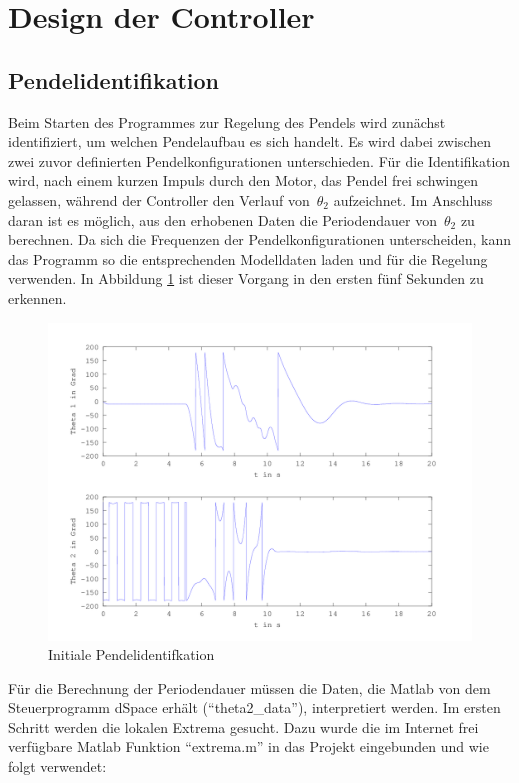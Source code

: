\section{Design der Controller}
\label{sec.Controller}
\subsection{Pendelidentifikation}
\label{Pendelidentifikation}
Beim Starten des Programmes zur Regelung des Pendels wird zunächst identifiziert, um welchen Pendelaufbau es sich handelt. Es wird dabei zwischen zwei zuvor definierten Pendelkonfigurationen unterschieden.
Für die Identifikation wird, nach einem kurzen Impuls durch den Motor, das Pendel frei schwingen gelassen, während der Controller den Verlauf von~$\theta_2$ aufzeichnet. Im Anschluss daran ist es möglich, aus den erhobenen Daten die Periodendauer von~$\theta_2$ zu berechnen. Da sich die Frequenzen der Pendelkonfigurationen unterscheiden, kann das Programm so die entsprechenden Modelldaten laden und für die Regelung verwenden. In Abbildung \ref{fig.Identifikation} ist dieser Vorgang in den ersten fünf Sekunden zu erkennen.

\begin{figure}[htbp]
	\centering	
	\includegraphics[width=1\textwidth]{Grafiken/Swingup_kurz.png}
	\caption{Initiale Pendelidentifkation}
	\label{fig.Identifikation}
\end{figure}

Für die Berechnung der Periodendauer müssen die Daten, die Matlab von dem Steuerprogramm dSpace erhält (``theta2\_data''), interpretiert werden. Im ersten Schritt werden die lokalen Extrema gesucht. Dazu wurde die im Internet frei verfügbare Matlab Funktion ``extrema.m'' in das Projekt eingebunden und wie folgt verwendet:\\


